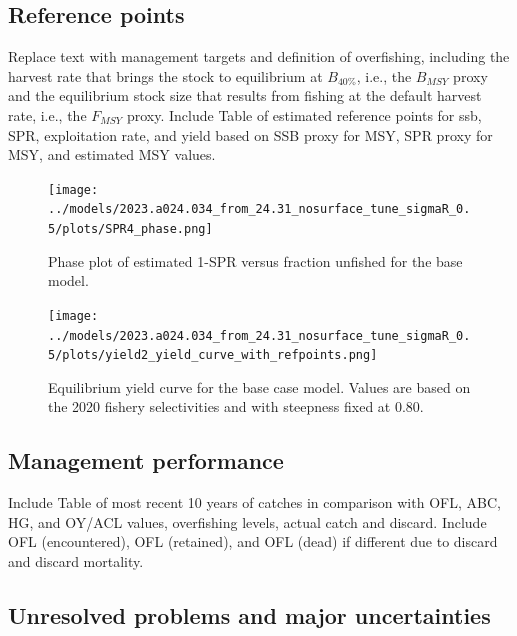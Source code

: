 \documentclass[11pt,
  english,
  letterpaper,
]{article}
\begin{document}
\hypertarget{reference-points}{%
\subsection*{Reference points}\label{reference-points}}

Replace text with management targets and definition of overfishing, including the harvest rate that brings the stock to equilibrium at \(B_{40\%}\), i.e., the \(B_{MSY}\) proxy and the equilibrium stock size that results from fishing at the default harvest rate, i.e., the \(F_{MSY}\) proxy. Include Table of estimated reference points for ssb, SPR, exploitation rate, and yield based on SSB proxy for MSY, SPR proxy for MSY, and estimated MSY values.

\begin{figure}
\centering
\texttt{[image: ../models/2023.a024.034\_from\_24.31\_nosurface\_tune\_sigmaR\_0.5/plots/SPR4\_phase.png]}
\caption{Phase plot of estimated 1-SPR versus fraction unfished for the base model.\label{fig:es-phase}}
\end{figure}

\begin{figure}
\centering
\texttt{[image: ../models/2023.a024.034\_from\_24.31\_nosurface\_tune\_sigmaR\_0.5/plots/yield2\_yield\_curve\_with\_refpoints.png]}
\caption{Equilibrium yield curve for the base case model. Values are based on the 2020 fishery selectivities and with steepness fixed at 0.80.\label{fig:es-yield}}
\end{figure}



\clearpage

\hypertarget{management-performance}{%
\subsection*{Management performance}\label{management-performance}}

Include Table of most recent 10 years of catches in comparison with OFL, ABC, HG, and OY/ACL values, overfishing levels, actual catch and discard. Include OFL (encountered), OFL (retained), and OFL (dead) if different due to discard and discard mortality.

\hypertarget{unresolved-problems-and-major-uncertainties}{%
\subsection*{Unresolved problems and major uncertainties}\label{unresolved-problems-and-major-uncertainties}}
\end{document}
